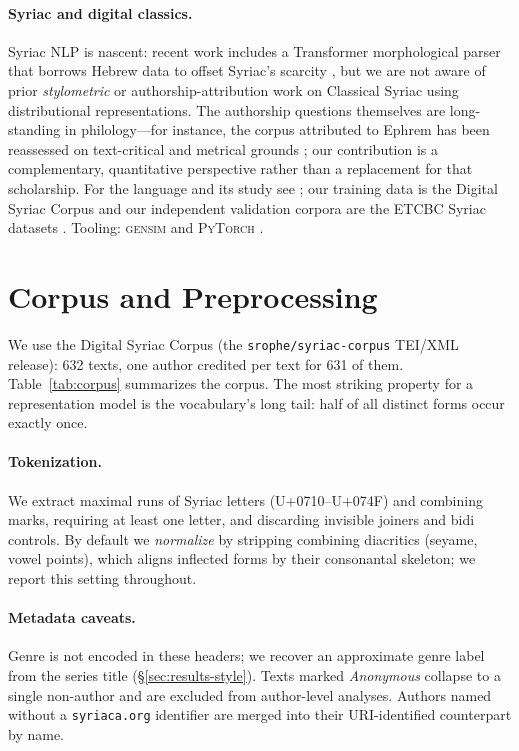 \documentclass[11pt]{article}
\begin{document}
\paragraph{Syriac and digital classics.}
Syriac NLP is nascent: recent work includes a Transformer morphological parser
that borrows Hebrew data to offset Syriac's scarcity
\cite{naaijer2023transformer}, but we are not aware of prior \emph{stylometric} or
authorship-attribution work on Classical Syriac using distributional
representations. The authorship questions themselves are long-standing in
philology---for instance, the corpus attributed to Ephrem has been reassessed on
text-critical and metrical grounds \cite{hartung2018authorship}; our contribution
is a complementary, quantitative perspective rather than a replacement for that
scholarship. For the language and its study see
\cite{brock2006introduction,butts2019syriac}; our training data is the Digital
Syriac Corpus \cite{digitalsyriaccorpus} and our independent validation corpora
are the ETCBC Syriac datasets \cite{etcbcsyriac}. Tooling: \textsc{gensim}
\cite{rehurek2010gensim} and \textsc{PyTorch} \cite{paszke2019pytorch}.

\section{Corpus and Preprocessing}
\label{sec:corpus}

We use the Digital Syriac Corpus (the \texttt{srophe/syriac-corpus} TEI/XML
release): 632 texts, one author credited per text for 631 of them.
Table~\ref{tab:corpus} summarizes the corpus. The most striking property for a
representation model is the vocabulary's long tail: half of all distinct forms
occur exactly once.



\paragraph{Tokenization.}
We extract maximal runs of Syriac letters (U+0710--U+074F) and combining marks,
requiring at least one letter, and discarding invisible joiners and bidi
controls. By default we \emph{normalize} by stripping combining diacritics
(seyame, vowel points), which aligns inflected forms by their consonantal
skeleton; we report this setting throughout.

\paragraph{Metadata caveats.}
Genre is not encoded in these headers; we recover an approximate genre label from
the series title (\S\ref{sec:results-style}). Texts marked \emph{Anonymous}
collapse to a single non-author and are excluded from author-level analyses.
Authors named without a \texttt{syriaca.org} identifier are merged into their
URI-identified counterpart by name.
\end{document}
